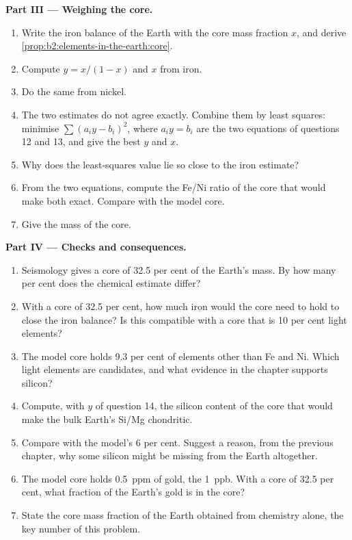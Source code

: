 \begin{problem}
\noindent\textbf{Part III --- Weighing the core.}
\begin{enumerate}[resume]
\item Write the iron balance of the Earth with the core mass fraction $x$, and
derive \cref{prop:b2:elements-in-the-earth:core}.
\item Compute $y = x/(1-x)$ and $x$ from iron.
\item Do the same from nickel.
\item The two estimates do not agree exactly. Combine them by least squares:
minimise $\sum (a_iy - b_i)^2$, where $a_i y = b_i$ are the two equations of
questions 12 and 13, and give the best $y$ and $x$.
\item Why does the least-squares value lie so close to the iron estimate?
\item From the two equations, compute the Fe/Ni ratio of the core that would make
both exact. Compare with the model core.
\item Give the mass of the core.
\end{enumerate}

\noindent\textbf{Part IV --- Checks and consequences.}
\begin{enumerate}[resume]
\item Seismology gives a core of 32.5 per cent of the Earth's mass. By how many
per cent does the chemical estimate differ?
\item With a core of 32.5 per cent, how much iron would the core need to hold to
close the iron balance? Is this compatible with a core that is 10 per cent light
elements?
\item The model core holds 9.3 per cent of elements other than Fe and Ni. Which
light elements are candidates, and what evidence in the chapter supports silicon?
\item Compute, with $y$ of question 14, the silicon content of the core that would
make the bulk Earth's Si/Mg chondritic.
\item Compare with the model's 6 per cent. Suggest a reason, from the previous
chapter, why some silicon might be missing from the Earth altogether.
\item The model core holds \qty{0.5}{ppm} of gold, the 
\qty{1}{ppb}. With a core of 32.5 per cent, what fraction of the Earth's gold is
in the core?
\item State the core mass fraction of the Earth obtained from chemistry alone,
the key number of this problem.
\end{enumerate}
\end{problem}
